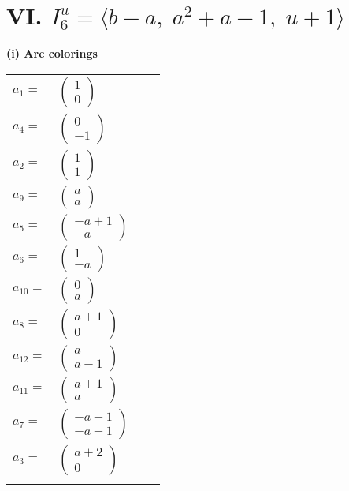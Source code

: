 \documentclass[1p]{elsarticle_modified}
\theoremstyle{definition}
\begin{document}
\centering \section*{VI. $I^u_{6}= \langle b- a,\;a^2+a-1,\;u+1 \rangle$}
\flushleft \textbf{(i) Arc colorings}\\
\begin{tabular}{m{7pt} m{180pt} m{7pt} m{180pt} }
\flushright $a_{1}=$&$\begin{pmatrix}1\\0\end{pmatrix}$ \\
\flushright $a_{4}=$&$\begin{pmatrix}0\\-1\end{pmatrix}$ \\
\flushright $a_{2}=$&$\begin{pmatrix}1\\1\end{pmatrix}$ \\
\flushright $a_{9}=$&$\begin{pmatrix}a\\a\end{pmatrix}$ \\
\flushright $a_{5}=$&$\begin{pmatrix}- a+1\\- a\end{pmatrix}$ \\
\flushright $a_{6}=$&$\begin{pmatrix}1\\- a\end{pmatrix}$ \\
\flushright $a_{10}=$&$\begin{pmatrix}0\\a\end{pmatrix}$ \\
\flushright $a_{8}=$&$\begin{pmatrix}a+1\\0\end{pmatrix}$ \\
\flushright $a_{12}=$&$\begin{pmatrix}a\\a-1\end{pmatrix}$ \\
\flushright $a_{11}=$&$\begin{pmatrix}a+1\\a\end{pmatrix}$ \\
\flushright $a_{7}=$&$\begin{pmatrix}- a-1\\- a-1\end{pmatrix}$ \\
\flushright $a_{3}=$&$\begin{pmatrix}a+2\\0\end{pmatrix}$\\&\end{tabular}
\end{document}
